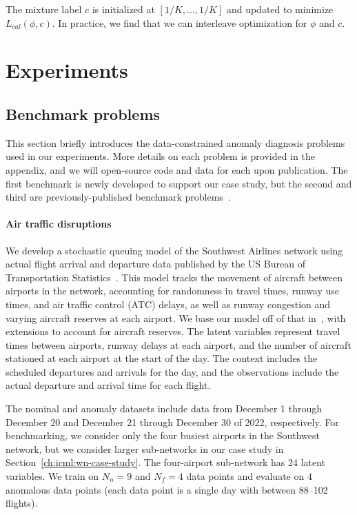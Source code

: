 The mixture label $c$ is initialized at $[1/K, \ldots, 1/K]$ and updated to minimize $L_{cal}(\phi, c)$. In practice, we find that we can interleave optimization for $\phi$ and $c$.

\section{Experiments}\label{ch:icml:experiments}

\subsection{Benchmark problems}\label{ch:icml:examples}

This section briefly introduces the data-constrained anomaly diagnosis problems used in our experiments. More details on each problem is provided in the appendix, and we will open-source code and data for each upon publication. The first benchmark is newly developed to support our case study, but the second and third are previously-published benchmark problems~\cite{keipourALFADatasetUAV2021,dengOpenFWILargescaleMultistructural2022}.

\paragraph{Air traffic disruptions} We develop a stochastic queuing model of the Southwest Airlines network using actual flight arrival and departure data published by the US Bureau of Transportation Statistics~\cite{bureauoftransportationstatisticsTranStatsDepartmentTransportation}. This model tracks the movement of aircraft between airports in the network, accounting for randomness in travel times, runway use times, and air traffic control (ATC) delays, as well as runway congestion and varying aircraft reserves at each airport. We base our model off of that in~\cite{pyrgiotisModellingDelayPropagation2013}, with extensions to account for aircraft reserves. The latent variables represent travel times between airports, runway delays at each airport, and the number of aircraft stationed at each airport at the start of the day. The context includes the scheduled departures and arrivals for the day, and the observations include the actual departure and arrival time for each flight.

The nominal and anomaly datasets include data from December 1 through December 20 and December 21 through December 30 of 2022, respectively. For benchmarking, we consider only the four busiest airports in the Southwest network, but we consider larger sub-networks in our case study in Section~\ref{ch:icml:wn-case-study}. The four-airport sub-network has 24 latent variables. We train on $N_n = 9$ and $N_f = 4$ data points and evaluate on $4$ anomalous data points (each data point is a single day with between 88--102 flights).

